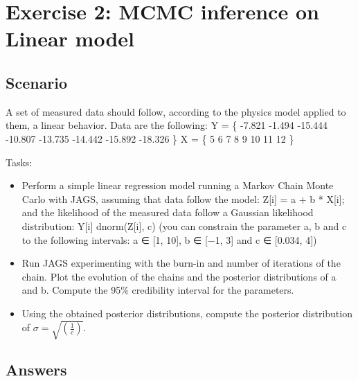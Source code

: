 \documentclass[
]{article}
\begin{document}
\hypertarget{exercise-2-mcmc-inference-on-linear-model}{%
\section{Exercise 2: MCMC inference on Linear
model}\label{exercise-2-mcmc-inference-on-linear-model}}

\hypertarget{scenario-1}{%
\subsection{Scenario}\label{scenario-1}}

A set of measured data should follow, according to the physics model
applied to them, a linear behavior. Data are the following: Y = \{
-7.821 -1.494 -15.444 -10.807 -13.735 -14.442 -15.892 -18.326 \} X = \{
5 6 7 8 9 10 11 12 \}

Tasks:

\begin{itemize}
\item
  Perform a simple linear regression model running a Markov Chain Monte
  Carlo with JAGS, assuming that data follow the model: Z{[}i{]} = a + b
  * X{[}i{]}; and the likelihood of the measured data follow a Gaussian
  likelihood distribution: Y{[}i{]} dnorm(Z{[}i{]}, c) (you can
  constrain the parameter a, b and c to the following intervals: a ∈
  {[}1, 10{]}, b ∈ {[}−1, 3{]} and c ∈ {[}0.034, 4{]})
\item
  Run JAGS experimenting with the burn-in and number of iterations of
  the chain. Plot the evolution of the chains and the posterior
  distributions of a and b. Compute the 95\% credibility interval for
  the parameters.
\item
  Using the obtained posterior distributions, compute the posterior
  distribution of \(\sigma = \sqrt{(\frac{1}{c})}\).
\end{itemize}

\hypertarget{answers-1}{%
\subsection{Answers}\label{answers-1}}
\end{document}
